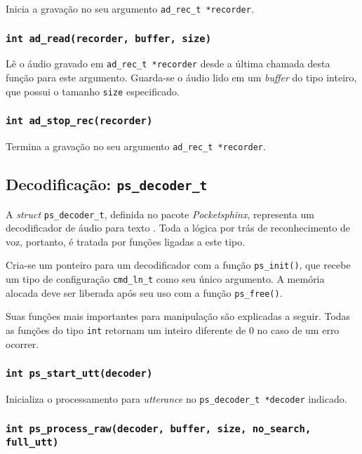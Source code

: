 Inicia a gravação no seu argumento \texttt{ad\_rec\_t *recorder}.

\subsubsection{\texttt{int ad\_read(recorder, buffer, size)}}

Lê o áudio gravado em \texttt{ad\_rec\_t *recorder} desde a última chamada desta função para este argumento. Guarda-se o áudio lido em um \textit{buffer} do tipo inteiro, que possui o tamanho \texttt{size} especificado.

\subsubsection{\texttt{int ad\_stop\_rec(recorder)}}

Termina a gravação no seu argumento \texttt{ad\_rec\_t *recorder}.


\subsection{Decodificação: \texttt{ps\_decoder\_t}}

A \textit{struct} \texttt{ps\_decoder\_t}, definida no pacote \textit{Pocketsphinx}, representa um decodificador de áudio para texto \citep{pocketsphinxInstallUse}. Toda a lógica por trás de reconhecimento de voz, portanto, é tratada por funções ligadas a este tipo.

Cria-se um ponteiro para um decodificador com a função \texttt{ps\_init()}, que recebe um tipo de configuração \texttt{cmd\_ln\_t} como seu único argumento. A memória alocada deve ser liberada após seu uso com a função \texttt{ps\_free()}.

Suas funções mais importantes para manipulação são explicadas a seguir. Todas as funções do tipo \texttt{int} retornam um inteiro diferente de 0 no caso de um erro ocorrer.

\subsubsection{\texttt{int ps\_start\_utt(decoder)}}

Inicializa o processamento para \textit{utterance} no \texttt{ps\_decoder\_t *decoder} indicado.

\subsubsection{\texttt{int ps\_process\_raw(decoder, buffer, size, no\_search, full\_utt)}}

